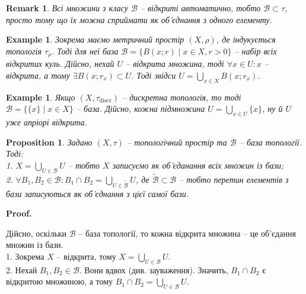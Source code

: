 \documentclass[a4paper, 10pt]{article}
\makeatletter
\theoremstyle{theoremdd}
\newtheorem{example}[theorem]{Example}
\newtheorem{proposition}[theorem]{Proposition}
\newtheorem{remark}[theorem]{Remark}
\renewenvironment{proof}[1][Proof.\\]{\par
\pushQED{\hfill \qed}%
\normalfont \topsep6\p@\@plus6\p@\relax
\trivlist
\item\relax
{\bfseries
#1\@addpunct{.}}\hspace\labelsep\ignorespaces
}{%
\popQED\endtrivlist\@endpefalse
}
\makeatother
\begin{document}
\begin{remark}
Всі множини з класу $\mathcal{B}$ -- відкриті автоматично, тобто $\mathcal{B} \subset \tau$, просто тому що їх можна сприймати як об'єднання з одного елементу.
\end{remark}

\begin{example}
Зокрема маємо метричний простір $(X,\rho)$, де індукується топологія $\tau_\rho$. Тоді для неї база $\mathcal{B} = \{ B(x;r) \mid x \in X, r > 0 \}$ -- набір всіх відкритих куль. Дійсно, нехай $U$ -- відкрита множина, тоді $\forall x \in U: x$ -- відкрита, а тому $\exists B(x;r_x) \subset U$. Тоді звідси $U = \displaystyle\bigcup_{x \in X} B(x;r_x)$. 
\end{example}

\begin{example}
Якщо $(X,\tau_{\text{discr}})$ -- дискретна топологія, то тоді $\mathcal{B} = \{\{x\} \mid x \in X\}$ -- база. Дійсно, кожна підмножина $U = \displaystyle\bigcup_{x \in U} \{x\}$, ну й $U$ уже апріорі відкрита.
\end{example}

\begin{proposition}
Задано $(X,\tau)$ -- топологічний простір та $\mathcal{B}$ -- база топології. Тоді:\\
1. $X = \displaystyle\bigcup_{U \in \mathcal{B}} U$ -- тобто $X$ записуємо як об'єданання всіх множин із бази;\\
2. $\forall B_1,B_2 \in \mathcal{B}: B_1 \cap B_2 = \displaystyle\bigcup_{U \in \mathcal{\tilde{B}}} U$, де $\mathcal{\tilde{B}} \subset \mathcal{B}$ -- тобто перетин елементів з бази записуються як об'єднання з цієї самої бази.
\end{proposition}

\begin{proof}
Дійсно, оскільки $\mathcal{B}$ -- база топології, то кожна відкрита множина -- це об'єдання множин із бази.\\
1. Зокрема $X$ -- відкрита, тому $X = \displaystyle\bigcup_{U \in \mathcal{B}} U$.\\
2. Нехай $B_1,B_2 \in \mathcal{B}$. Вони вдвох (див. зауваження). Значить, $B_1 \cap B_2$ є відкритою множиною, а тому $B_1 \cap B_2 = \displaystyle\bigcup_{U \in \mathcal{B}} U$.
\end{proof}
\end{document}
